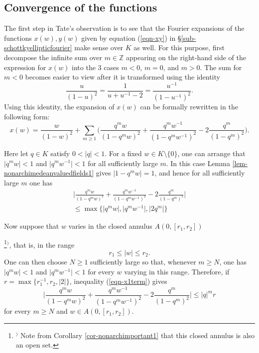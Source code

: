 \documentclass[a4paper,12pt, dvipdfmx]{jsbook}
\def\Z{\mathbb{Z}}
\newcommand{\abs}[1]{\lvert#1\rvert}
\theoremstyle{plain}
\theoremstyle{definition}
\newcounter{chushaku}
\def\chu#1{\addtocounter{chushaku}{1}\footnote[\value{chushaku}]{${}^)$ #1}${}^)$}
\begin{document}
\subsection{Convergence of the functions}\label{sub-Tateobservationconv}
The first step in Tate's observation is to see that the Fourier expansions of the functions $x(w),y(w)$ given by equation (\ref{eqn-xy}) in \S\ref{sub-schottkyellipticfourier} make sense over $K$ as well.
For this purpose, first decompose the infinite sum over $m\in\Z$ appearing on the right-hand side of the expression for $x(w)$ into the $3$ cases $m<0$, $m=0$, and $m>0$.
The sum for $m<0$ becomes easier to view after it is transformed using the identity
$$
\frac{u}{(1-u)^2}=\frac{1}{u+u^{-1}-2}=\frac{u^{-1}}{(1-u^{-1})^2}.
$$
Using this identity, the expansion of $x(w)$ can be formally rewritten in the following form:
\begin{equation}\label{eqn-x1}
x(w)=\frac{w}{(1-w)^2}+\sum_{m\geq 1}\bigg(\frac{q^mw}{(1-q^mw)^2}+\frac{q^mw^{-1}}{(1-q^mw^{-1})^2}-2\frac{q^m}{(1-q^m)^2}\bigg).
\end{equation}

Here let $q\in K$ satisfy $0<\abs{q}<1$.
For a fixed $w\in K\setminus\{0\}$, one can arrange that $\abs{q^mw}<1$ and $\abs{q^mw^{-1}}<1$ for all sufficiently large $m$.
In this case Lemma \ref{lem-nonarchimedeanvaluedfields1} gives $\abs{1-q^mw}=1$, and hence for all sufficiently large $m$ one has
\begin{multline}\label{eqn-x1term}
\bigg|\frac{q^mw}{(1-q^mw)^2}+\frac{q^mw^{-1}}{(1-q^mw^{-1})^2}-2\frac{q^m}{(1-q^m)^2}\bigg|\\ \leq\max\{\abs{q^mw},\abs{q^mw^{-1}},\abs{2q^m}\}%
\end{multline}

Now suppose that $w$ varies in the closed annulus $A(0,[r_1,r_2])$\chu{Note from Corollary \ref{cor-nonarchimportant1} that this closed annulus is also an open set.}, that is, in the range
$$
r_1\leq\abs{w}\leq r_2.
$$
One can then choose $N\geq 1$ sufficiently large so that, whenever $m\geq N$, one has $\abs{q^mw}<1$ and $\abs{q^mw^{-1}}<1$ for every $w$ varying in this range.
Therefore, if $r=\max\{r^{-1}_1,r_2,\abs{2}\}$, inequality (\ref{eqn-x1term}) gives
\begin{equation}\label{eqn-x1term2}
\bigg|\frac{q^mw}{(1-q^mw)^2}+\frac{q^mw^{-1}}{(1-q^mw^{-1})^2}-2\frac{q^m}{(1-q^m)^2}\bigg|\leq\abs{q}^mr
\end{equation}
for every $m\geq N$ and $w\in A(0,[r_1,r_2])$.
\end{document}
